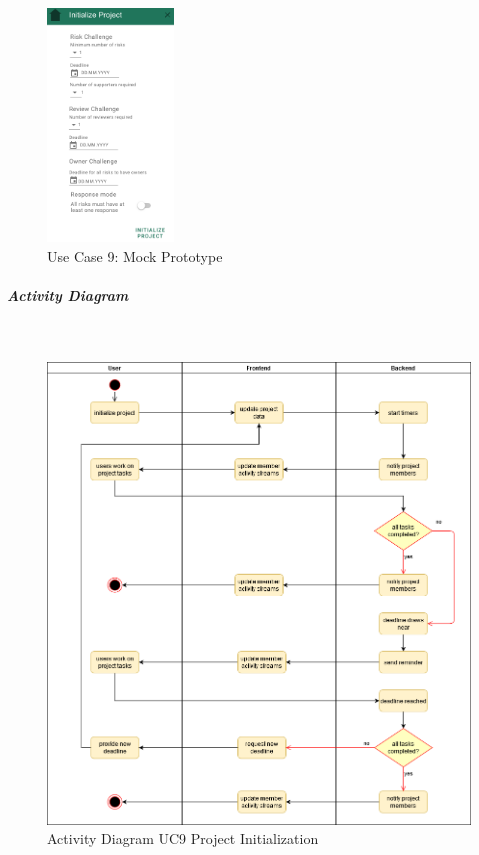 \begin{figure}[H]
	\centering
	\includegraphics[width=0.3\textwidth]{Assets/UC_Screenshots/UC9S.png}
	\caption{Use Case 9: Mock Prototype}
	\label{fig:useCase9Detail}
\end{figure}
\newpage
\subparagraph{Activity Diagram}\mbox{}\\
\begin{figure}[H]
	\centering
	\includegraphics[width=1.0\textwidth]{Content/Domain/UC9Initialization.png}
	\caption{Activity Diagram  \ac{UC}9 Project Initialization}
	\label{fig:label14}
\end{figure}
\newpage
